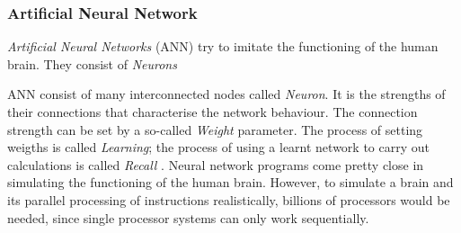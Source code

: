 %
%
%
%
%
%
%

\subsubsection{Artificial Neural Network}
\label{artificial_neural_network_heading}

\emph{Artificial Neural Networks} (ANN) try to imitate the functioning of the
human brain. They consist of \emph{Neurons}

ANN consist of many interconnected nodes called \emph{Neuron}.
It is the strengths of their connections that characterise the network behaviour.
The connection strength can be set by a so-called \emph{Weight} parameter. The
process of setting weigths is called \emph{Learning}; the process of using a learnt
network to carry out calculations is called \emph{Recall} \cite{heller1997}.
Neural network programs come pretty close in simulating the functioning of the
human brain. However, to simulate a brain and its parallel processing of
instructions realistically, billions of processors would be needed, since single
processor systems can only work sequentially.


